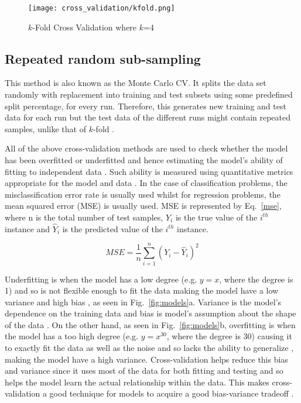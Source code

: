 \begin{figure}
  \centering
  \texttt{[image: cross\_validation/kfold.png]}
  \caption{$k$-Fold Cross Validation where $k$=4}
  \label{fig:kfold}
\end{figure}

\subsection{Repeated random sub-sampling} 
This method is also known as the Monte Carlo CV. It splits the data set randomly with replacement into training and test subsets using some predefined split percentage, for every run. Therefore, this generates new training and test data for each run but the test data of the different runs might contain repeated samples, unlike that of $k$-fold \citep{xu2001monte}.


All of the above cross-validation methods are used to check whether the model has been overfitted or underfitted and hence estimating the model's ability of fitting to independent data . Such ability is measured using quantitative metrics appropriate for the model and data \citep{kohavi1995study, arlot2010survey}. In the case of classification problems, the misclassification error rate is usually used whilst for regression problems, the mean squared error (MSE) is usually used. MSE is represented by Eq.~\ref{mse}, where n is the total number of test samples, $Y_i$ is the true value of the $i^{th}$ instance and $\hat{Y}_i$ is the predicted value of the $i^{th}$ instance.

\begin{equation}\label{mse}
MSE = \frac{1}{n}\sum^{n}_{i=1}(Y_i - \hat{Y}_i)^2
\end{equation}

Underfitting  is when the model has a low degree (e.g. $y = x$, where the degree is 1) and so is not flexible enough to fit the data making the model have a low variance and high bias \citep{baumann2003cross}, as seen in Fig.~\ref{fig:models}a. Variance is the model's dependence on the training data and bias is model's assumption about the shape of the data \citep{arlot2010survey}. On the other hand, as seen in Fig.~\ref{fig:models}b, overfitting  is when the model has a too high degree (e.g. $y = x^{30}$, where the degree is 30) causing it to exactly fit the data as well as the noise and so lacks the ability to generalize \citep{baumann2003cross}, making the model have a high variance. Cross-validation helps reduce this bias and variance since it uses most of the data for both fitting and testing and so helps the model learn the actual relationship within the data. This makes cross-validation a good technique for models to acquire a good bias-variance tradeoff \citep{arlot2010survey}.


